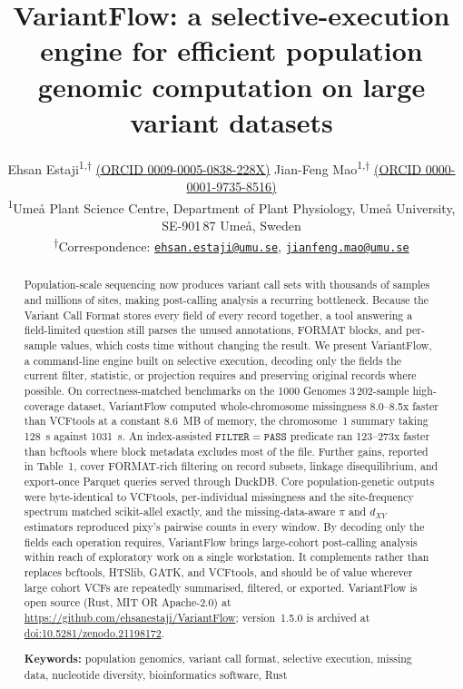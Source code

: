 \documentclass[11pt]{article}
\title{VariantFlow: a selective-execution engine for efficient population genomic computation on large variant datasets}
\author{
Ehsan Estaji\textsuperscript{1,$\dag$}
\href{https://orcid.org/0009-0005-0838-228X}{\small(ORCID 0009-0005-0838-228X)} \qquad
Jian-Feng Mao\textsuperscript{1,$\dag$}
\href{https://orcid.org/0000-0001-9735-8516}{\small(ORCID 0000-0001-9735-8516)} \\[6pt]
\small \textsuperscript{1}Ume{\aa} Plant Science Centre,
Department of Plant Physiology, Ume{\aa} University,
SE-901\,87 Ume{\aa}, Sweden \\[4pt]
\small \textsuperscript{$\dag$}Correspondence:
       \href{mailto:ehsan.estaji@umu.se}{\texttt{ehsan.estaji@umu.se}},
       \href{mailto:jianfeng.mao@umu.se}{\texttt{jianfeng.mao@umu.se}}
}
\date{}
\begin{document}
\linenumbers
\maketitle
\newpage

\begin{abstract}
\noindent
Population-scale sequencing now produces variant call sets with thousands of
samples and millions of sites, making post-calling analysis a recurring
bottleneck. Because the Variant Call Format stores every field of every record
together, a tool answering a field-limited question still parses the unused
annotations, FORMAT blocks, and per-sample values, which costs time without
changing the result. We present VariantFlow, a command-line engine built on
selective execution, decoding only the fields the current filter, statistic,
or projection requires and preserving original records where possible. On
correctness-matched benchmarks on the 1000 Genomes 3\,202-sample high-coverage
dataset, VariantFlow computed whole-chromosome missingness 8.0--8.5x faster than
VCFtools at a constant 8.6~MB of memory, the chromosome~1 summary taking 128~s
against 1031~s. An index-assisted $\mathtt{FILTER}=\mathtt{PASS}$ predicate ran
123--273x faster than bcftools where block metadata excludes most of the file.
Further gains, reported in Table~1, cover FORMAT-rich filtering on record
subsets, linkage disequilibrium, and export-once Parquet queries served through
DuckDB. Core population-genetic outputs were byte-identical to VCFtools,
per-individual missingness and the site-frequency spectrum matched scikit-allel
exactly, and the missing-data-aware $\pi$ and $d_{XY}$ estimators reproduced
pixy's pairwise counts in every window. By decoding only the fields each
operation requires, VariantFlow brings large-cohort post-calling analysis within
reach of exploratory work on a single workstation. It complements rather than
replaces bcftools, HTSlib, GATK, and VCFtools, and should be of value wherever
large cohort VCFs are repeatedly summarised, filtered, or exported. VariantFlow
is open source (Rust, MIT OR
Apache-2.0) at \url{https://github.com/ehsanestaji/VariantFlow}; version~1.5.0
is archived at
\href{https://doi.org/10.5281/zenodo.21198172}{doi:10.5281/zenodo.21198172}.

\vspace{0.6em}
\noindent\textbf{Keywords:} population genomics, variant call format,
selective execution, missing data, nucleotide diversity, bioinformatics
software, Rust
\end{abstract}
\newpage
\end{document}
